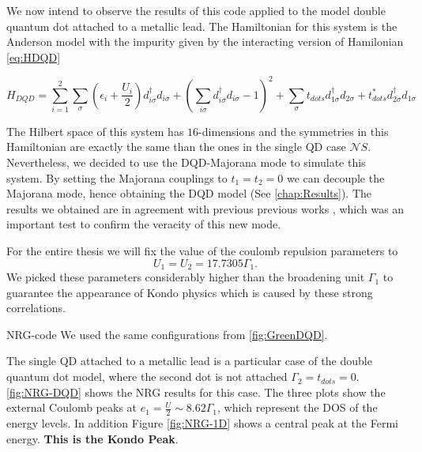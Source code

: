 We now intend to observe the results of this code applied to the model double quantum dot attached to a metallic lead.
The  Hamiltonian for this system is the Anderson model with the impurity given by the interacting version of Hamilonian \ref{eq:HDQD}

\begin{equation}
H_{DQD}=\sum_{i=1}^2\sum_\sigma \left( \epsilon_{i} + \frac{U_i}{2} \right) d_{i\sigma}^{\dagger}d_{i\sigma} + \left(\sum_{i\sigma} d_{i\sigma}^{\dagger}d_{i\sigma} -1 \right)^2 + \sum_\sigma t_{dots}d_{1\sigma}^{\dagger}d_{2\sigma}+t_{dots}^*d_{2\sigma}^{\dagger}d_{1\sigma}
\label{eq:interactingDQD}
\end{equation}

 The Hilbert space of this system has $16$-dimensions and the symmetries in this Hamiltonian are exactly the same than the ones in the single QD case $\mathcal{N}S$. Nevertheless, we decided to use the DQD-Majorana mode to simulate this system. By setting the Majorana couplings to $t_1=t_2= 0$ we can decouple the Majorana mode, hence obtaining the DQD model (See \ref{chap:Results}). The results we obtained are in agreement with previous previous works \cite{dias_da_silva_transmission_2008}, which was an important test to confirm the veracity of this new mode. 

For the entire thesis we will fix the value of the coulomb repulsion parameters to 
\begin{equation}
 U_1 = U_2 = 17.7305 \Gamma_1.
\end{equation}
\noindent We picked these parameters considerably higher than the broadening unit $\Gamma_1$ to guarantee the appearance of Kondo physics which is caused by these strong correlations. 




 NRG-code  We used the same configurations from \ref{fig:GreenDQD}. 



The single QD attached to a metallic lead is a particular case of the double quantum dot model, where the second dot is not attached $\Gamma_2 = t_{dots}=0$.  \ref{fig:NRG-DQD} shows the NRG results for this case. The three plots show the external Coulomb peaks at $e_1 = \frac{U}{2} \sim 8.62\Gamma_1$, which represent the DOS of the energy levels. In addition  Figure \ref{fig:NRG-1D} shows a central peak at the Fermi energy. \textbf{This is the Kondo Peak}. 

